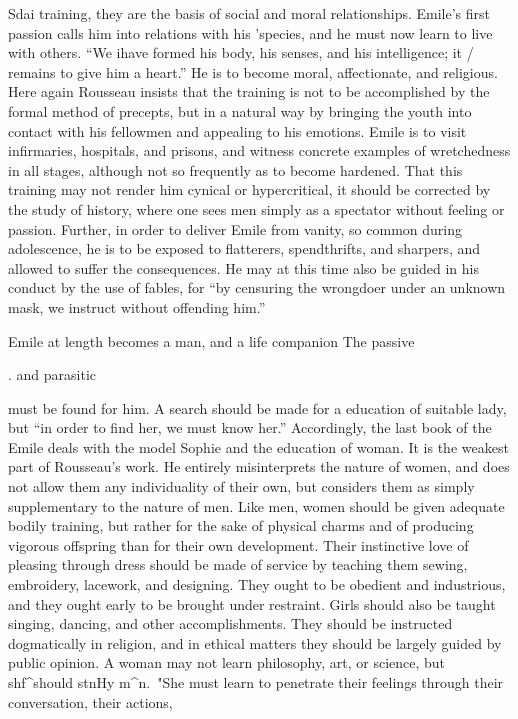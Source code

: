 \documentclass[
]{book}
\begin{document}
Sdai training, they are the basis of social and moral relationships. Emile's first passion calls him into relations with his 'species, and he must now learn to live with others. ``We ihave formed his body, his senses, and his intelligence; it / remains to give him a heart.'' He is to become moral, affectionate, and religious. Here again Rousseau insists that the training is not to be accomplished by the formal method of precepts, but in a natural way by bringing the youth into contact with his fellowmen and appealing to his emotions. Emile is to visit infirmaries, hospitals, and prisons, and witness concrete examples of wretchedness in all stages, although not so frequently as to become hardened. That this training may not render him cynical\protect\hypertarget{ch19.xmlux5cux23para.274.1.0.box.156.222.1047.475.q.60}{}{ or hypercritical, it should be corrected by the study of history, where one sees men simply as a spectator without feeling or passion. Further, in order to deliver Emile from vanity, so common during adolescence, he is to be exposed to flatterers, spendthrifts, and sharpers, and allowed to suffer the consequences. He may at this time also be guided in his conduct by the use of fables, for ``by censuring the wrongdoer under an unknown mask, we instruct without offending him.''}

Emile at length becomes a man, and a life companion The passive

. and parasitic

must be found for him. A search should be made for a education of suitable lady, but ``in order to find her, we must know her.'' Accordingly, the last book of the Emile deals with the model Sophie and the education of woman. It is the weakest part of Rousseau's work. He entirely misinterprets the nature of women, and does not allow them any individuality of their own, but considers them as simply supplementary to the nature of men. Like men, women should be given adequate bodily training, but rather for the sake of physical charms and of producing vigorous offspring than for their own development. Their instinctive love of pleasing through dress should be made of service by teaching them sewing, embroidery, lacework, and designing. They ought to be obedient and industrious, and they ought early to be brought under restraint. Girls should also be taught singing, dancing, and other accomplishments. They should be instructed dogmatically in religion, and in ethical matters they should be largely guided by public opinion. A woman may not learn philosophy, art, or science, but shf\^{}should stnHy m\^{}n.~"She must learn to penetrate their feelings through their conversation, their actions,
\end{document}
